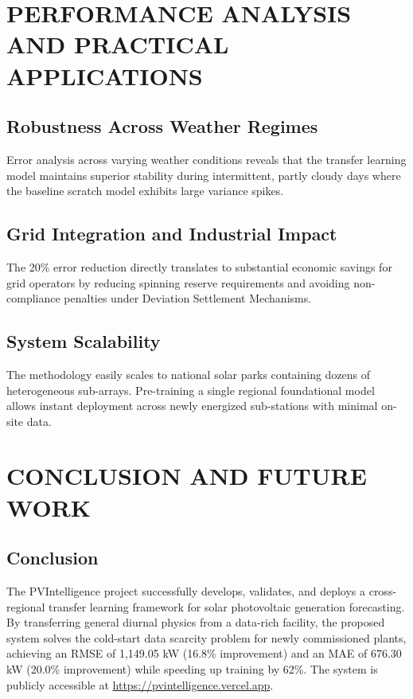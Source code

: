 \documentclass[12pt,a4paper,oneside]{report}
\begin{document}
\newpage
\chapter{PERFORMANCE ANALYSIS AND PRACTICAL APPLICATIONS}

\section{Robustness Across Weather Regimes}
Error analysis across varying weather conditions reveals that the transfer learning model maintains superior stability during intermittent, partly cloudy days where the baseline scratch model exhibits large variance spikes.

\section{Grid Integration and Industrial Impact}
The 20\% error reduction directly translates to substantial economic savings for grid operators by reducing spinning reserve requirements and avoiding non-compliance penalties under Deviation Settlement Mechanisms.

\section{System Scalability}
The methodology easily scales to national solar parks containing dozens of heterogeneous sub-arrays. Pre-training a single regional foundational model allows instant deployment across newly energized sub-stations with minimal on-site data.

\newpage
\chapter{CONCLUSION AND FUTURE WORK}

\section{Conclusion}
The PVIntelligence project successfully develops, validates, and deploys a cross-regional transfer learning framework for solar photovoltaic generation forecasting. By transferring general diurnal physics from a data-rich facility, the proposed system solves the cold-start data scarcity problem for newly commissioned plants, achieving an RMSE of 1,149.05 kW (16.8\% improvement) and an MAE of 676.30 kW (20.0\% improvement) while speeding up training by 62\%. The system is publicly accessible at \url{https://pvintelligence.vercel.app}.
\end{document}
